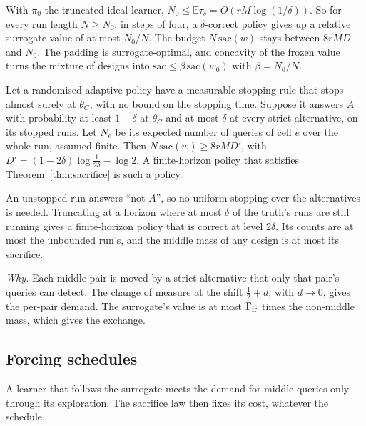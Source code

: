 With $\pi_{0}$ the truncated ideal learner, $N_{0}\le\mathbb{E}\tau_{\delta}
=O(rM\log(1/\delta))$. So for every run length $N\ge N_{0}$, in steps of four, a
$\delta$-correct policy gives up a relative surrogate value of at most $N_{0}/N$. The budget
$N\,\mathrm{sac}(\bar w)$ stays between $8rMD$ and $N_{0}$. The padding is surrogate-optimal, and
concavity of the frozen value turns the mixture of designs into
$\mathrm{sac}\le\beta\,\mathrm{sac}(\bar w_{0})$ with $\beta=N_{0}/N$.

\begin{theorem}
\label{thm:sacstop}
Let a randomised adaptive policy have a measurable stopping rule that stops almost surely at
$\theta_{C}$, with no bound on the stopping time. Suppose it answers $A$ with probability at least
$1-\delta$ at $\theta_{C}$ and at most $\delta$ at every strict alternative, on its stopped runs.
Let $N_{e}$ be its expected number of queries of cell $e$ over the whole run, assumed finite. Then
$N\,\mathrm{sac}(\bar w)\ge8rMD'$, with $D'=(1-2\delta)\log\frac1{2\delta}-\log2$. A finite-horizon
policy that satisfies Theorem~\ref{thm:sacrifice} is such a policy.
\end{theorem}


An unstopped run answers ``not $A$'', so no uniform stopping over the alternatives is needed.
Truncating at a horizon where at most $\delta$ of the truth's runs are still running gives a
finite-horizon policy that is correct at level $2\delta$. Its counts are at most the unbounded
run's, and the middle mass of any design is at most its sacrifice.

\emph{Why.} Each middle pair is moved by a strict alternative that only that pair's queries can
detect. The change of measure at the shift $\frac12+d$, with $d\to0$, gives the per-pair demand.
The surrogate's value is at most $\Gamma_{\rm fr}$ times the non-middle mass, which gives the
exchange.

\subsection{Forcing schedules}

A learner that follows the surrogate meets the demand for middle queries only through its
exploration. The sacrifice law then fixes its cost, whatever the schedule.

